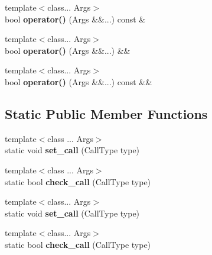 \begin{DoxyCompactItemize}
{\footnotesize template$<$class... Args$>$ }\\bool {\bfseries operator()} (Args \&\&...) const \&
\item 
\mbox{\label{struct_forwarding_call_object_ac4d7f1e653669ab822ffc365dc4a0d66}} 
{\footnotesize template$<$class... Args$>$ }\\bool {\bfseries operator()} (Args \&\&...) \&\&
\item 
\mbox{\label{struct_forwarding_call_object_acc740392b5a8975461a889fe1562c402}} 
{\footnotesize template$<$class... Args$>$ }\\bool {\bfseries operator()} (Args \&\&...) const \&\&
\end{DoxyCompactItemize}
\subsection*{Static Public Member Functions}
\begin{DoxyCompactItemize}
\item 
\mbox{\label{struct_forwarding_call_object_a407d319171ade5ec63770cf712ca0b83}} 
{\footnotesize template$<$class ... Args$>$ }\\static void {\bfseries set\+\_\+call} (Call\+Type type)
\item 
\mbox{\label{struct_forwarding_call_object_ad27c88a0f3cdd323c29ffae5bfb4668c}} 
{\footnotesize template$<$class ... Args$>$ }\\static bool {\bfseries check\+\_\+call} (Call\+Type type)
\item 
\mbox{\label{struct_forwarding_call_object_a407d319171ade5ec63770cf712ca0b83}} 
{\footnotesize template$<$class... Args$>$ }\\static void {\bfseries set\+\_\+call} (Call\+Type type)
\item 
\mbox{\label{struct_forwarding_call_object_ad27c88a0f3cdd323c29ffae5bfb4668c}} 
{\footnotesize template$<$class... Args$>$ }\\static bool {\bfseries check\+\_\+call} (Call\+Type type)
\end{DoxyCompactItemize}
